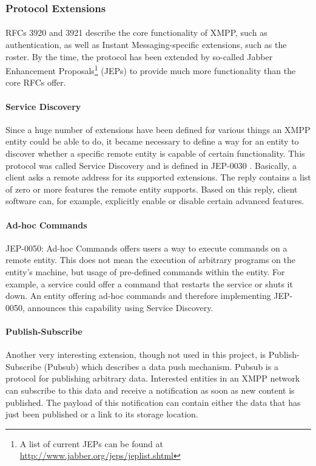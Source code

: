 \subsubsection{Protocol Extensions}
\paragraph{}
RFCs 3920 and 3921 describe the core functionality of XMPP, such as authentication, as well as Instant Messaging-specific extensions, such as the roster. By the time, the protocol has been extended by so-called Jabber Enhancement Proposals\footnote{A list of current JEPs can be found at \href{http://www.jabber.org/jeps/jeplist.shtml}{http://www.jabber.org/jeps/jeplist.shtml}} (JEPs) to provide much more functionality than the core RFCs offer.

\paragraph{Service Discovery}
\label{sec:disco}
Since a huge number of extensions have been defined for various things an XMPP entity could be able to do, it became necessary to define a way for an entity to discover whether a specific remote entity is capable of certain functionality. This protocol was called Service Discovery and is defined in JEP-0030 \cite{jep0030}. Basically, a client asks a remote address for its supported extensions. The reply contains a list of zero or more features the remote entity supports. Based on this reply, client software can, for example, explicitly enable or disable certain advanced features.

\paragraph{Ad-hoc Commands}
JEP-0050: Ad-hoc Commands \cite{jep0050} offers users a way to execute commands on a remote entity. This does not mean the execution of arbitrary programs on the entity's machine, but usage of pre-defined commands within the entity. For example, a service could offer a command that restarts the service or shuts it down. An entity offering ad-hoc commands and therefore implementing JEP-0050, announces this capability using Service Discovery.

\paragraph{Publish-Subscribe}
Another very interesting extension, though not used in this project, is Publish-Subscribe (Pubsub) \cite{jep0060} which describes a data push mechanism. Pubsub is a protocol for publishing arbitrary data. Interested entities in an XMPP network can subscribe to this data and receive a notification as soon as new content is published. The payload of this notification can contain either the data that has just been published or a link to its storage location.

